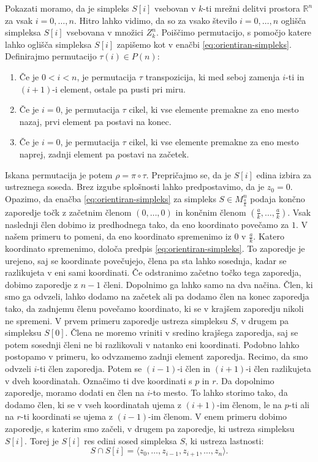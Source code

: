 \documentclass[mat1]{fmfdelo}
\newcommand{\R}{\mathbb R}
\newcommand{\0}{0}
\begin{document}
\begin{dokaz}
Pokazati moramo, da je simpleks $S[i]$ vsebovan v $k$-ti mrežni delitvi prostora $\R^n$ za vsak $i = 0, \dots, n$. Hitro lahko vidimo, da so za vsako število $i = 0, \dots, n$ oglišča simpleksa $S[i]$ vsebovana v množici $Z_k^n$. Poiščimo permutacijo, s pomočjo katere lahko oglišča simpleksa $S[i]$ zapišemo kot v enačbi \eqref{eq:orientiran-simpleks}. 
Definirajmo permutacijo $\tau(i) \in P(n)$:
\begin{enumerate}
\item Če je $0 < i < n$, je permutacija $\tau$ transpozicija, ki med seboj zamenja $i$-ti in $(i+1)$-i element, ostale pa pusti pri miru.
\item Če je $i = 0$, je permutacija $\tau$ cikel, ki vse elemente premakne za eno mesto nazaj, prvi element pa postavi na konec.
\item Če je $i = 0$, je permutacija $\tau$ cikel, ki vse elemente premakne za eno mesto naprej, zadnji element pa postavi na začetek.
\end{enumerate}
Iskana permutacija je potem $\rho = \pi \circ \tau$.
Prepričajmo se, da je $S[i]$ edina izbira za ustreznega soseda. Brez izgube splošnosti lahko predpostavimo, da je $z_0 = 0$. Opazimo, da enačba \eqref{eq:orientiran-simpleks} za simpleks $S \in M_{\frac{a}{k}}^n$ podaja končno zaporedje točk z začetnim členom $(0, \dots, 0)$ in končnim členom $(\frac{a}{k}, \dots, \frac{a}{k})$. Vsak naslednji člen dobimo iz predhodnega tako, da eno koordinato povečamo za $1$. V našem primeru to pomeni, da eno koordinato spremenimo iz $0$ v $\frac{a}{k}$. Katero koordinato spremenimo, določa predpis \eqref{eq:orientiran-simpleks}. To zaporedje je urejeno, saj se koordinate povečujejo, člena pa sta lahko sosednja, kadar se razlikujeta v eni sami koordinati. Če odstranimo začetno točko tega zaporedja, dobimo zaporedje z $n-1$ členi. Dopolnimo ga lahko samo na dva načina. Člen, ki smo ga odvzeli, lahko dodamo na začetek ali pa dodamo člen na konec zaporedja tako, da zadnjemu členu povečamo koordinato, ki se v krajšem zaporedju nikoli ne spremeni. V prvem primeru zaporedje ustreza simpleksu $S$, v drugem pa simpleksu $S[0]$. Člena ne moremo vriniti v sredino krajšega zaporedja, saj se potem sosednji členi ne bi razlikovali v natanko eni koordinati. 
Podobno lahko postopamo v primeru, ko odvzamemo zadnji element zaporedja. Recimo, da smo odvzeli $i$-ti člen zaporedja. Potem se $(i-1)$-i člen in $(i+1)$-i člen razlikujeta v dveh koordinatah. Označimo ti dve koordinati s $p$ in $r$. Da dopolnimo zaporedje, moramo dodati en člen na $i$-to mesto. To lahko storimo tako, da dodamo člen, ki se v vseh koordinatah ujema z $(i+1)$-im členom, le na $p$-ti ali na $r$-ti koordinati se ujema z  $(i-1)$-im členom. V enem primeru dobimo zaporedje, s katerim smo začeli, v drugem pa zaporedje, ki ustreza simpleksu $S[i]$.
Torej je $S[i]$ res edini sosed simpleksa $S$, ki ustreza lastnosti:
$$S \cap S[i] = \langle z_0, \dots, z_{i-1}, z_{i+1}, \dots, z_n \rangle.$$

\end{dokaz}
\end{document}
